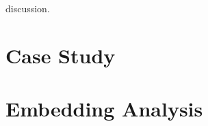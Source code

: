 \hspace{24pt}

discussion.

\section{Case Study} \label{sec:case_study}


\section{Embedding Analysis} \label{sec:analysis}
